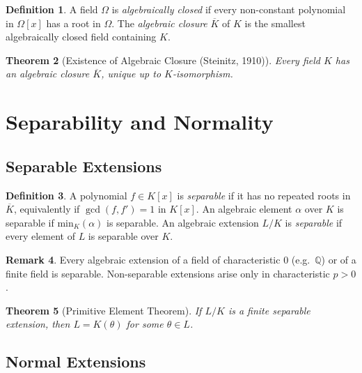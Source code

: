 \documentclass[12pt,a4paper]{amsart}
\newtheorem{theorem}{Theorem}[section]
\theoremstyle{definition}
\newtheorem{definition}[theorem]{Definition}
\newtheorem{remark}[theorem]{Remark}
\newcommand{\Q}{\mathbb{Q}}
\begin{document}
\begin{definition}
A field $\Omega$ is \emph{algebraically closed} if every non-constant polynomial
in $\Omega[x]$ has a root in $\Omega$. The \emph{algebraic closure}
$\overline{K}$ of $K$ is the smallest algebraically closed field containing $K$.
\end{definition}

\begin{theorem}[Existence of Algebraic Closure (Steinitz, 1910)]
Every field $K$ has an algebraic closure $\overline{K}$, unique up to
$K$-isomorphism.
\end{theorem}

\section{Separability and Normality}

\subsection{Separable Extensions}

\begin{definition}
A polynomial $f \in K[x]$ is \emph{separable} if it has no repeated roots in
$\overline{K}$, equivalently if $\gcd(f, f') = 1$ in $K[x]$. An algebraic
element $\alpha$ over $K$ is separable if $\mathrm{min}_K(\alpha)$ is
separable. An algebraic extension $L/K$ is \emph{separable} if every element
of $L$ is separable over $K$.
\end{definition}

\begin{remark}
Every algebraic extension of a field of characteristic $0$ (e.g.\ $\Q$) or of
a finite field is separable. Non-separable extensions arise only in
characteristic $p > 0$.
\end{remark}

\begin{theorem}[Primitive Element Theorem]
If $L/K$ is a finite separable extension, then $L = K(\theta)$ for some
$\theta \in L$.
\end{theorem}

\subsection{Normal Extensions}
\end{document}
